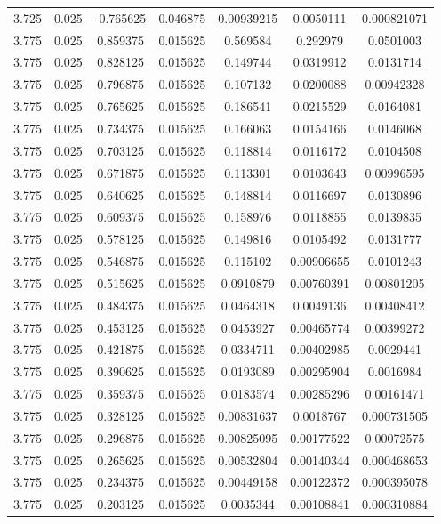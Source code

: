\begin{flushleft}
\begin{longtable}{ccccccc}
3.725 & 0.025 & -0.765625 & 0.046875 & 0.00939215 & 0.0050111 & 0.000821071  \\ 
3.775 & 0.025 & 0.859375 & 0.015625 & 0.569584 & 0.292979 & 0.0501003  \\ 
3.775 & 0.025 & 0.828125 & 0.015625 & 0.149744 & 0.0319912 & 0.0131714  \\ 
3.775 & 0.025 & 0.796875 & 0.015625 & 0.107132 & 0.0200088 & 0.00942328  \\ 
3.775 & 0.025 & 0.765625 & 0.015625 & 0.186541 & 0.0215529 & 0.0164081  \\ 
3.775 & 0.025 & 0.734375 & 0.015625 & 0.166063 & 0.0154166 & 0.0146068  \\ 
3.775 & 0.025 & 0.703125 & 0.015625 & 0.118814 & 0.0116172 & 0.0104508  \\ 
3.775 & 0.025 & 0.671875 & 0.015625 & 0.113301 & 0.0103643 & 0.00996595  \\ 
3.775 & 0.025 & 0.640625 & 0.015625 & 0.148814 & 0.0116697 & 0.0130896  \\ 
3.775 & 0.025 & 0.609375 & 0.015625 & 0.158976 & 0.0118855 & 0.0139835  \\ 
3.775 & 0.025 & 0.578125 & 0.015625 & 0.149816 & 0.0105492 & 0.0131777  \\ 
3.775 & 0.025 & 0.546875 & 0.015625 & 0.115102 & 0.00906655 & 0.0101243  \\ 
3.775 & 0.025 & 0.515625 & 0.015625 & 0.0910879 & 0.00760391 & 0.00801205  \\ 
3.775 & 0.025 & 0.484375 & 0.015625 & 0.0464318 & 0.0049136 & 0.00408412  \\ 
3.775 & 0.025 & 0.453125 & 0.015625 & 0.0453927 & 0.00465774 & 0.00399272  \\ 
3.775 & 0.025 & 0.421875 & 0.015625 & 0.0334711 & 0.00402985 & 0.0029441  \\ 
3.775 & 0.025 & 0.390625 & 0.015625 & 0.0193089 & 0.00295904 & 0.0016984  \\ 
3.775 & 0.025 & 0.359375 & 0.015625 & 0.0183574 & 0.00285296 & 0.00161471  \\ 
3.775 & 0.025 & 0.328125 & 0.015625 & 0.00831637 & 0.0018767 & 0.000731505  \\ 
3.775 & 0.025 & 0.296875 & 0.015625 & 0.00825095 & 0.00177522 & 0.00072575  \\ 
3.775 & 0.025 & 0.265625 & 0.015625 & 0.00532804 & 0.00140344 & 0.000468653  \\ 
3.775 & 0.025 & 0.234375 & 0.015625 & 0.00449158 & 0.00122372 & 0.000395078  \\ 
3.775 & 0.025 & 0.203125 & 0.015625 & 0.0035344 & 0.00108841 & 0.000310884  \\ 

\end{longtable}
\end{flushleft}
